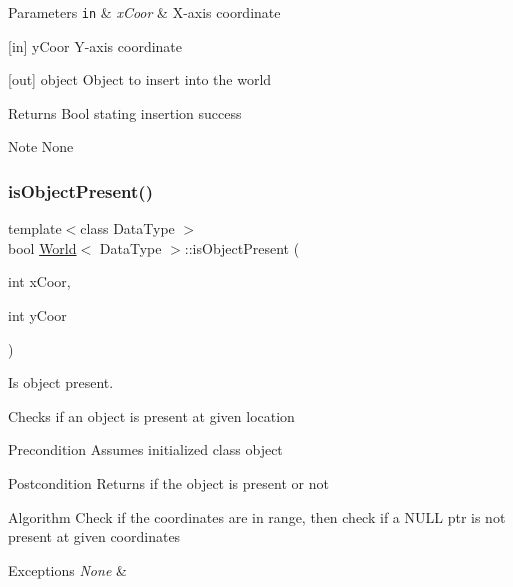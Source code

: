 \begin{DoxyParams}[1]{Parameters}
\mbox{\tt in}  & {\em x\+Coor} & X-\/axis coordinate\\
\hline
\end{DoxyParams}
\mbox{[}in\mbox{]} y\+Coor Y-\/axis coordinate

\mbox{[}out\mbox{]} object Object to insert into the world

\begin{DoxyReturn}{Returns}
Bool stating insertion success
\end{DoxyReturn}
\begin{DoxyNote}{Note}
None 
\end{DoxyNote}
\hypertarget{class_world_afcbf777e4ffdfcf6c3d9245376d6a538}{}\label{class_world_afcbf777e4ffdfcf6c3d9245376d6a538} 
\subsubsection{\texorpdfstring{is\+Object\+Present()}{isObjectPresent()}}
{\footnotesize\ttfamily template$<$class Data\+Type $>$ \\
bool \hyperlink{class_world}{World}$<$ Data\+Type $>$\+::is\+Object\+Present (\begin{DoxyParamCaption}\item[{int}]{x\+Coor,  }\item[{int}]{y\+Coor }\end{DoxyParamCaption})}



Is object present. 

Checks if an object is present at given location

\begin{DoxyPrecond}{Precondition}
Assumes initialized class object
\end{DoxyPrecond}
\begin{DoxyPostcond}{Postcondition}
Returns if the object is present or not
\end{DoxyPostcond}
\begin{DoxyParagraph}{Algorithm}
Check if the coordinates are in range, then check if a N\+U\+LL ptr is not present at given coordinates
\end{DoxyParagraph}

\begin{DoxyExceptions}{Exceptions}
{\em None} & \\
\hline
\end{DoxyExceptions}

